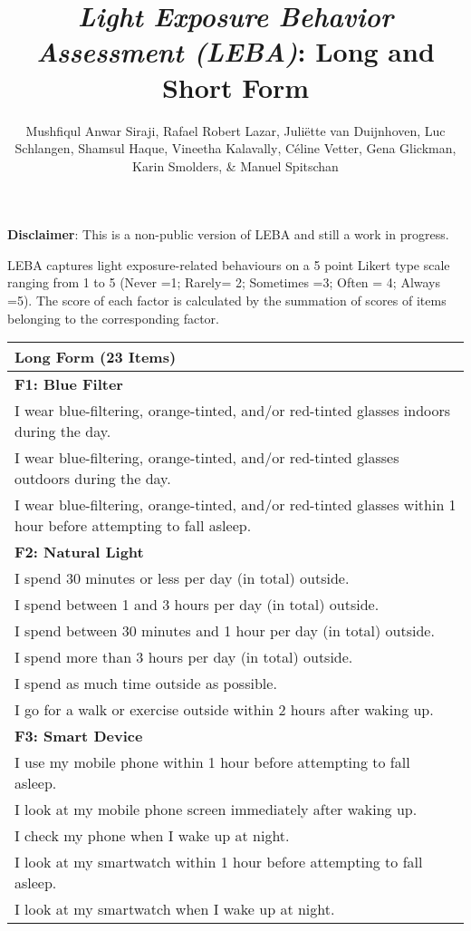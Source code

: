 \documentclass[
  english,
  man,floatsintext]{apa6}
\title{\emph{Light Exposure Behavior Assessment (LEBA)}: Long and Short Form}
\author{Mushfiqul Anwar Siraji\textsuperscript{}, Rafael Robert Lazar\textsuperscript{}, Juliëtte van Duijnhoven\textsuperscript{}, Luc Schlangen\textsuperscript{}, Shamsul Haque\textsuperscript{}, Vineetha Kalavally\textsuperscript{}, Céline Vetter\textsuperscript{}, Gena Glickman\textsuperscript{}, Karin Smolders\textsuperscript{}, \& Manuel Spitschan\textsuperscript{}}
\date{}
\affiliation{\phantom{0}}
\begin{document}
\maketitle

\textbf{Disclaimer}: This is a non-public version of LEBA and still a work in progress.

LEBA captures light exposure-related behaviours on a 5 point Likert type scale ranging from 1 to 5 (Never =1; Rarely= 2; Sometimes =3; Often = 4; Always =5). The score of each factor is calculated by the summation of scores of items belonging to the corresponding factor.

\begin{longtable}[]{@{}
  >{\raggedright\arraybackslash}p{}@{}}
\toprule
Long Form (23 Items) \\
\midrule
\endhead
\textbf{F1: Blue Filter} \\
I wear blue-filtering, orange-tinted, and/or red-tinted glasses indoors during the day. \\
I wear blue-filtering, orange-tinted, and/or red-tinted glasses outdoors during the day. \\
I wear blue-filtering, orange-tinted, and/or red-tinted glasses within 1 hour before attempting to fall asleep. \\
\textbf{F2: Natural Light} \\
I spend 30 minutes or less per day (in total) outside. \\
I spend between 1 and 3 hours per day (in total) outside. \\
I spend between 30 minutes and 1 hour per day (in total) outside. \\
I spend more than 3 hours per day (in total) outside. \\
I spend as much time outside as possible. \\
I go for a walk or exercise outside within 2 hours after waking up. \\
\textbf{F3: Smart Device} \\
I use my mobile phone within 1 hour before attempting to fall asleep. \\
I look at my mobile phone screen immediately after waking up. \\
I check my phone when I wake up at night. \\
I look at my smartwatch within 1 hour before attempting to fall asleep. \\
I look at my smartwatch when I wake up at night. \\

\end{longtable}
\end{document}
